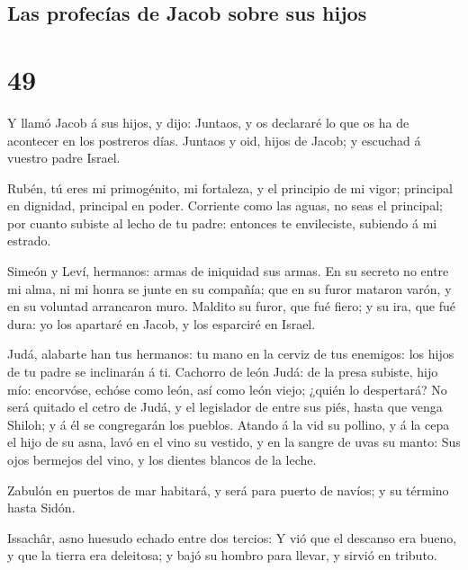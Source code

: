 \hypertarget{las-profecuxedas-de-jacob-sobre-sus-hijos}{%
\subsection{Las profecías de Jacob sobre sus
hijos}\label{las-profecuxedas-de-jacob-sobre-sus-hijos}}

\hypertarget{section-01-49}{%
\section{49}\label{section-01-49}}

 Y llamó Jacob á sus hijos, y dijo: Juntaos, y os
declararé lo que os ha de acontecer en los postreros días.
 Juntaos y oid, hijos de Jacob; y escuchad á vuestro padre
Israel.

 Rubén, tú eres mi primogénito, mi fortaleza, y el
principio de mi vigor; principal en dignidad, principal en poder.
 Corriente como las aguas, no seas el principal; por
cuanto subiste al lecho de tu padre: entonces te envileciste, subiendo á
mi estrado.

 Simeón y Leví, hermanos: armas de iniquidad sus armas.
 En su secreto no entre mi alma, ni mi honra se junte en
su compañía; que en su furor mataron varón, y en su voluntad arrancaron
muro.  Maldito su furor, que fué fiero; y su ira, que fué
dura: yo los apartaré en Jacob, y los esparciré en Israel.

 Judá, alabarte han tus hermanos: tu mano en la cerviz de
tus enemigos: los hijos de tu padre se inclinarán á ti. 
Cachorro de león Judá: de la presa subiste, hijo mío: encorvóse, echóse
como león, así como león viejo; ¿quién lo despertará?  No
será quitado el cetro de Judá, y el legislador de entre sus piés, hasta
que venga Shiloh; y á él se congregarán los pueblos. 
Atando á la vid su pollino, y á la cepa el hijo de su asna, lavó en el
vino su vestido, y en la sangre de uvas su manto:  Sus
ojos bermejos del vino, y los dientes blancos de la leche.

 Zabulón en puertos de mar habitará, y será para puerto
de navíos; y su término hasta Sidón.

 Issachâr, asno huesudo echado entre dos tercios:
 Y vió que el descanso era bueno, y que la tierra era
deleitosa; y bajó su hombro para llevar, y sirvió en tributo.

